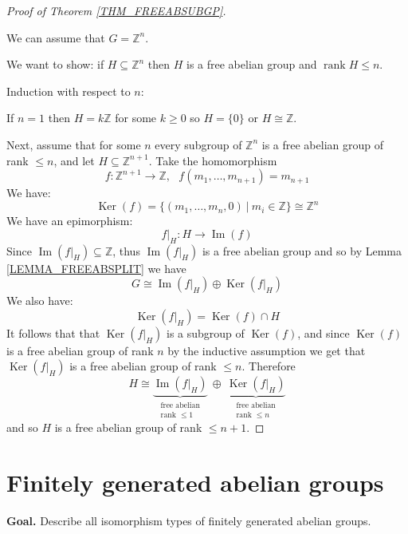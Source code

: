 \documentclass[12pt, letterpaper, oneside]{article}
\theoremstyle{plain}
\theoremstyle{definition}
\newcommand{\Z}{{\mathbb Z}}
\renewcommand{\Im}{\operatorname{Im}}
\newcommand{\Ker}{\operatorname{Ker}}
\newcommand{\rank}{\operatorname{rank}}
\newcommand{\vs}{\vskip 5mm}
\begin{document}
\begin{proof}[Proof of Theorem \ref{THM_FREEABSUBGP}]\ 

We can assume that $G = \Z^{n}$. 

We want to show: if $H\subseteq \Z^{n}$ then $H$ is a free abelian group and $\rank H \leq n$. 

Induction with respect to $n$:


If $n=1$ then $H = k\Z$ for some $k\geq 0$ so $H = \{0\}$ or $H\cong \Z$. 

Next,  assume that for some $n$ every subgroup of $\Z^{n}$ is a free abelian group of 
rank $\leq n$, and let $H\subseteq \Z^{n+1}$.  Take the homomorphism 
$$f\colon \Z^{n+1} \to \Z, \ \ \ f(m_{1}, \dots, m_{n+1}) = m_{n+1}$$
We have:
$$\Ker(f) = \{(m_{1}, \dots, m_{n}, 0) \ | \  m_{i}\in \Z\}\cong \Z^{n}$$
We have an epimorphism:
$$f|_{H}\colon H \to \Im(f)$$
Since $\Im(f|_{H})\subseteq \Z$, thus $\Im(f|_{H})$ is a free abelian group and so by 
Lemma \ref{LEMMA_FREEABSPLIT} we have 
$$G\cong \Im(f|_{H})\oplus \Ker(f|_{H})$$
We also have:
$$\Ker(f|_{H}) = \Ker(f)\cap H$$ 
It follows that that $\Ker(f|_{H})$ is a subgroup of $\Ker(f)$, and since $\Ker(f)$ is 
a free abelian group of rank $n$ by the inductive assumption we get that 
$\Ker(f|_{H})$ is a free abelian group of rank $\leq n$.
Therefore 
$$H\cong 
\underbrace{\Im(f|_{H})}_{
\begin{smallmatrix}
  \text{free abelian}\\
  \text{rank $\leq 1$}
\end{smallmatrix}
}
\ \oplus \  
\underbrace{\Ker(f|_{H})}_{
\begin{smallmatrix}
  \text{free abelian}\\
  \text{rank $\leq n$}
\end{smallmatrix}
}
$$
and so $H$ is a free abelian group of rank $\leq n+1$. 
\end{proof}

\vs



\newpage
\section{Finitely generated abelian groups}
\label{SEC_FINGENABGPS}


\textbf{Goal.} Describe all isomorphism types of finitely generated abelian groups. 
\end{document}
